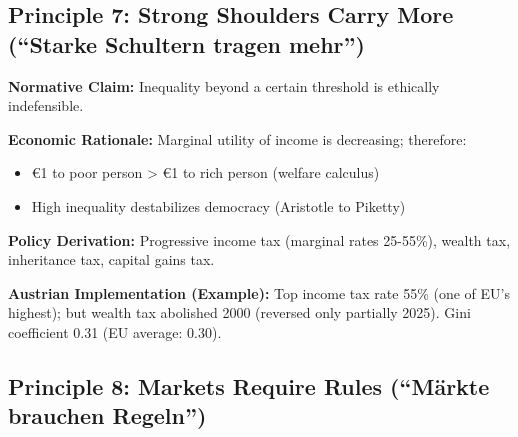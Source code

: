 
\subsection{Principle 7: Strong Shoulders Carry More (``Starke Schultern tragen mehr'')}

\begin{tcolorbox}[colback=gray!5!white, colframe=gray!75!black,
    title=Principle BF-7: Progressive Redistribution]

\textbf{Normative Claim:} Inequality beyond a certain threshold is ethically indefensible.

\textbf{Economic Rationale:} Marginal utility of income is decreasing; therefore:
\begin{itemize}[nosep]
\item €1 to poor person > €1 to rich person (welfare calculus)
\item High inequality destabilizes democracy (Aristotle to Piketty)
\end{itemize}

\textbf{Policy Derivation:} Progressive income tax (marginal rates 25-55\%), wealth tax, inheritance tax, capital gains tax.

\textbf{Austrian Implementation (Example):} Top income tax rate 55\% (one of EU's highest); but wealth tax abolished 2000 (reversed only partially 2025). Gini coefficient 0.31 (EU average: 0.30).

\end{tcolorbox}


\subsection{Principle 8: Markets Require Rules (``Märkte brauchen Regeln'')}

